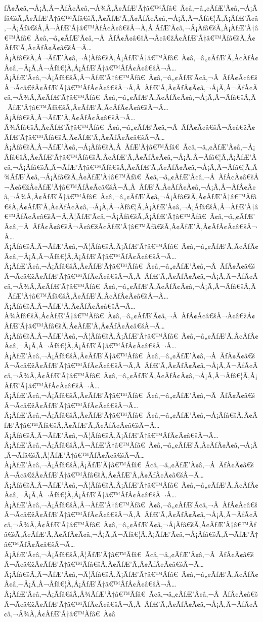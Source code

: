 \documentclass{article}
\begin{document}
\begin{outline}[enumerate]
ƒÂ¢Ã¢â‚¬Å¡Ã‚Â¬ÃƒÂ¢Ã¢â‚¬Å¾Ã‚Â¢ÃƒÆ’Ã†â€™Ãƒâ€ Ã¢â‚¬â„¢ÃƒÆ’Ã¢â‚¬Å¡Ãƒâ€šÃ‚Â¢ÃƒÆ’Ã†â€™Ãƒâ€šÃ‚Â¢ÃƒÆ’Ã‚Â¢ÃƒÂ¢Ã¢â‚¬Å¡Ã‚Â¬Ãƒâ€¦Ã‚Â¡ÃƒÆ’Ã¢â‚¬Å¡Ãƒâ€šÃ‚Â¬ÃƒÆ’Ã†â€™ÃƒÂ¢Ã¢â€šÂ¬Ã‚Â¦ÃƒÆ’Ã¢â‚¬Å¡Ãƒâ€šÃ‚Â¡ÃƒÆ’Ã†â€™Ãƒâ€ Ã¢â‚¬â„¢ÃƒÆ’Ã¢â‚¬Â ÃƒÂ¢Ã¢â€šÂ¬Ã¢â€žÂ¢ÃƒÆ’Ã†â€™Ãƒâ€šÃ‚Â¢ÃƒÆ’Ã‚Â¢ÃƒÂ¢Ã¢â€šÂ¬Ã…Â¡Ãƒâ€šÃ‚Â¬ÃƒÆ’Ã¢â‚¬Â¦Ãƒâ€šÃ‚Â¡ÃƒÆ’Ã†â€™Ãƒâ€ Ã¢â‚¬â„¢ÃƒÆ’Ã‚Â¢ÃƒÂ¢Ã¢â‚¬Å¡Ã‚Â¬Ãƒâ€¦Ã‚Â¡ÃƒÆ’Ã†â€™ÃƒÂ¢Ã¢â€šÂ¬Ã…Â¡ÃƒÆ’Ã¢â‚¬Å¡Ãƒâ€šÃ‚Â¬ÃƒÆ’Ã†â€™Ãƒâ€ Ã¢â‚¬â„¢ÃƒÆ’Ã¢â‚¬Â ÃƒÂ¢Ã¢â€šÂ¬Ã¢â€žÂ¢ÃƒÆ’Ã†â€™ÃƒÂ¢Ã¢â€šÂ¬Ã‚Â ÃƒÆ’Ã‚Â¢ÃƒÂ¢Ã¢â‚¬Å¡Ã‚Â¬ÃƒÂ¢Ã¢â‚¬Å¾Ã‚Â¢ÃƒÆ’Ã†â€™Ãƒâ€ Ã¢â‚¬â„¢ÃƒÆ’Ã‚Â¢ÃƒÂ¢Ã¢â‚¬Å¡Ã‚Â¬Ãƒâ€šÃ‚Â ÃƒÆ’Ã†â€™Ãƒâ€šÃ‚Â¢ÃƒÆ’Ã‚Â¢ÃƒÂ¢Ã¢â€šÂ¬Ã…Â¡Ãƒâ€šÃ‚Â¬ÃƒÆ’Ã‚Â¢ÃƒÂ¢Ã¢â€šÂ¬Ã…Â¾Ãƒâ€šÃ‚Â¢ÃƒÆ’Ã†â€™Ãƒâ€ Ã¢â‚¬â„¢ÃƒÆ’Ã¢â‚¬Â ÃƒÂ¢Ã¢â€šÂ¬Ã¢â€žÂ¢ÃƒÆ’Ã†â€™Ãƒâ€šÃ‚Â¢ÃƒÆ’Ã‚Â¢ÃƒÂ¢Ã¢â€šÂ¬Ã…Â¡Ãƒâ€šÃ‚Â¬ÃƒÆ’Ã¢â‚¬Å¡Ãƒâ€šÃ‚Â ÃƒÆ’Ã†â€™Ãƒâ€ Ã¢â‚¬â„¢ÃƒÆ’Ã¢â‚¬Å¡Ãƒâ€šÃ‚Â¢ÃƒÆ’Ã†â€™Ãƒâ€šÃ‚Â¢ÃƒÆ’Ã‚Â¢ÃƒÂ¢Ã¢â‚¬Å¡Ã‚Â¬Ãƒâ€¦Ã‚Â¡ÃƒÆ’Ã¢â‚¬Å¡Ãƒâ€šÃ‚Â¬ÃƒÆ’Ã†â€™Ãƒâ€šÃ‚Â¢ÃƒÆ’Ã‚Â¢ÃƒÂ¢Ã¢â‚¬Å¡Ã‚Â¬Ãƒâ€¦Ã‚Â¾ÃƒÆ’Ã¢â‚¬Å¡Ãƒâ€šÃ‚Â¢ÃƒÆ’Ã†â€™Ãƒâ€ Ã¢â‚¬â„¢ÃƒÆ’Ã¢â‚¬Â ÃƒÂ¢Ã¢â€šÂ¬Ã¢â€žÂ¢ÃƒÆ’Ã†â€™ÃƒÂ¢Ã¢â€šÂ¬Ã‚Â ÃƒÆ’Ã‚Â¢ÃƒÂ¢Ã¢â‚¬Å¡Ã‚Â¬ÃƒÂ¢Ã¢â‚¬Å¾Ã‚Â¢ÃƒÆ’Ã†â€™Ãƒâ€ Ã¢â‚¬â„¢ÃƒÆ’Ã¢â‚¬Å¡Ãƒâ€šÃ‚Â¢ÃƒÆ’Ã†â€™Ãƒâ€šÃ‚Â¢ÃƒÆ’Ã‚Â¢ÃƒÂ¢Ã¢â‚¬Å¡Ã‚Â¬Ãƒâ€¦Ã‚Â¡ÃƒÆ’Ã¢â‚¬Å¡Ãƒâ€šÃ‚Â¬ÃƒÆ’Ã†â€™ÃƒÂ¢Ã¢â€šÂ¬Ã‚Â¦ÃƒÆ’Ã¢â‚¬Å¡Ãƒâ€šÃ‚Â¡ÃƒÆ’Ã†â€™Ãƒâ€ Ã¢â‚¬â„¢ÃƒÆ’Ã¢â‚¬Â ÃƒÂ¢Ã¢â€šÂ¬Ã¢â€žÂ¢ÃƒÆ’Ã†â€™Ãƒâ€šÃ‚Â¢ÃƒÆ’Ã‚Â¢ÃƒÂ¢Ã¢â€šÂ¬Ã…Â¡Ãƒâ€šÃ‚Â¬ÃƒÆ’Ã¢â‚¬Â¦Ãƒâ€šÃ‚Â¡ÃƒÆ’Ã†â€™Ãƒâ€ Ã¢â‚¬â„¢ÃƒÆ’Ã‚Â¢ÃƒÂ¢Ã¢â‚¬Å¡Ã‚Â¬Ãƒâ€¦Ã‚Â¡ÃƒÆ’Ã†â€™ÃƒÂ¢Ã¢â€šÂ¬Ã…Â¡ÃƒÆ’Ã¢â‚¬Å¡Ãƒâ€šÃ‚Â¢ÃƒÆ’Ã†â€™Ãƒâ€ Ã¢â‚¬â„¢ÃƒÆ’Ã¢â‚¬Â ÃƒÂ¢Ã¢â€šÂ¬Ã¢â€žÂ¢ÃƒÆ’Ã†â€™ÃƒÂ¢Ã¢â€šÂ¬Ã‚Â ÃƒÆ’Ã‚Â¢ÃƒÂ¢Ã¢â‚¬Å¡Ã‚Â¬ÃƒÂ¢Ã¢â‚¬Å¾Ã‚Â¢ÃƒÆ’Ã†â€™Ãƒâ€ Ã¢â‚¬â„¢ÃƒÆ’Ã‚Â¢ÃƒÂ¢Ã¢â‚¬Å¡Ã‚Â¬Ãƒâ€šÃ‚Â ÃƒÆ’Ã†â€™Ãƒâ€šÃ‚Â¢ÃƒÆ’Ã‚Â¢ÃƒÂ¢Ã¢â€šÂ¬Ã…Â¡Ãƒâ€šÃ‚Â¬ÃƒÆ’Ã‚Â¢ÃƒÂ¢Ã¢â€šÂ¬Ã…Â¾Ãƒâ€šÃ‚Â¢ÃƒÆ’Ã†â€™Ãƒâ€ Ã¢â‚¬â„¢ÃƒÆ’Ã¢â‚¬Â ÃƒÂ¢Ã¢â€šÂ¬Ã¢â€žÂ¢ÃƒÆ’Ã†â€™Ãƒâ€šÃ‚Â¢ÃƒÆ’Ã‚Â¢ÃƒÂ¢Ã¢â€šÂ¬Ã…Â¡Ãƒâ€šÃ‚Â¬ÃƒÆ’Ã¢â‚¬Â¦Ãƒâ€šÃ‚Â¡ÃƒÆ’Ã†â€™Ãƒâ€ Ã¢â‚¬â„¢ÃƒÆ’Ã‚Â¢ÃƒÂ¢Ã¢â‚¬Å¡Ã‚Â¬Ãƒâ€¦Ã‚Â¡ÃƒÆ’Ã†â€™ÃƒÂ¢Ã¢â€šÂ¬Ã…Â¡ÃƒÆ’Ã¢â‚¬Å¡Ãƒâ€šÃ‚Â¢ÃƒÆ’Ã†â€™Ãƒâ€ Ã¢â‚¬â„¢ÃƒÆ’Ã¢â‚¬Â ÃƒÂ¢Ã¢â€šÂ¬Ã¢â€žÂ¢ÃƒÆ’Ã†â€™ÃƒÂ¢Ã¢â€šÂ¬Ã‚Â ÃƒÆ’Ã‚Â¢ÃƒÂ¢Ã¢â‚¬Å¡Ã‚Â¬ÃƒÂ¢Ã¢â‚¬Å¾Ã‚Â¢ÃƒÆ’Ã†â€™Ãƒâ€ Ã¢â‚¬â„¢ÃƒÆ’Ã‚Â¢ÃƒÂ¢Ã¢â‚¬Å¡Ã‚Â¬Ãƒâ€¦Ã‚Â¡ÃƒÆ’Ã†â€™ÃƒÂ¢Ã¢â€šÂ¬Ã…Â¡ÃƒÆ’Ã¢â‚¬Å¡Ãƒâ€šÃ‚Â¢ÃƒÆ’Ã†â€™Ãƒâ€ Ã¢â‚¬â„¢ÃƒÆ’Ã¢â‚¬Â ÃƒÂ¢Ã¢â€šÂ¬Ã¢â€žÂ¢ÃƒÆ’Ã†â€™ÃƒÂ¢Ã¢â€šÂ¬Ã…Â¡ÃƒÆ’Ã¢â‚¬Å¡Ãƒâ€šÃ‚Â¢ÃƒÆ’Ã†â€™Ãƒâ€ Ã¢â‚¬â„¢ÃƒÆ’Ã¢â‚¬Å¡Ãƒâ€šÃ‚Â¢ÃƒÆ’Ã†â€™Ãƒâ€šÃ‚Â¢ÃƒÆ’Ã‚Â¢ÃƒÂ¢Ã¢â€šÂ¬Ã…Â¡Ãƒâ€šÃ‚Â¬ÃƒÆ’Ã¢â‚¬Â¦Ãƒâ€šÃ‚Â¡ÃƒÆ’Ã†â€™ÃƒÂ¢Ã¢â€šÂ¬Ã…Â¡ÃƒÆ’Ã¢â‚¬Å¡Ãƒâ€šÃ‚Â¬ÃƒÆ’Ã†â€™Ãƒâ€ Ã¢â‚¬â„¢ÃƒÆ’Ã‚Â¢ÃƒÂ¢Ã¢â‚¬Å¡Ã‚Â¬Ãƒâ€šÃ‚Â¦ÃƒÆ’Ã†â€™ÃƒÂ¢Ã¢â€šÂ¬Ã…Â¡ÃƒÆ’Ã¢â‚¬Å¡Ãƒâ€šÃ‚Â¡ÃƒÆ’Ã†â€™Ãƒâ€ Ã¢â‚¬â„¢ÃƒÆ’Ã¢â‚¬Â ÃƒÂ¢Ã¢â€šÂ¬Ã¢â€žÂ¢ÃƒÆ’Ã†â€™Ãƒâ€šÃ‚Â¢ÃƒÆ’Ã‚Â¢ÃƒÂ¢Ã¢â€šÂ¬Ã…Â¡Ãƒâ€šÃ‚Â¬ÃƒÆ’Ã¢â‚¬Â¦Ãƒâ€šÃ‚Â¡ÃƒÆ’Ã†â€™Ãƒâ€ Ã¢â‚¬â„¢ÃƒÆ’Ã‚Â¢ÃƒÂ¢Ã¢â‚¬Å¡Ã‚Â¬Ãƒâ€¦Ã‚Â¡ÃƒÆ’Ã†â€™ÃƒÂ¢Ã¢â€šÂ¬Ã…Â¡ÃƒÆ’Ã¢â‚¬Å¡Ãƒâ€šÃ‚Â¬ÃƒÆ’Ã†â€™Ãƒâ€ Ã¢â‚¬â„¢ÃƒÆ’Ã¢â‚¬Â ÃƒÂ¢Ã¢â€šÂ¬Ã¢â€žÂ¢ÃƒÆ’Ã†â€™ÃƒÂ¢Ã¢â€šÂ¬Ã‚Â ÃƒÆ’Ã‚Â¢ÃƒÂ¢Ã¢â‚¬Å¡Ã‚Â¬ÃƒÂ¢Ã¢â‚¬Å¾Ã‚Â¢ÃƒÆ’Ã†â€™Ãƒâ€ Ã¢â‚¬â„¢ÃƒÆ’Ã¢â‚¬Å¡Ãƒâ€šÃ‚Â¢ÃƒÆ’Ã†â€™Ãƒâ€šÃ‚Â¢ÃƒÆ’Ã‚Â¢ÃƒÂ¢Ã¢â‚¬Å¡Ã‚Â¬Ãƒâ€¦Ã‚Â¡ÃƒÆ’Ã¢â‚¬Å¡Ãƒâ€šÃ‚Â¬ÃƒÆ’Ã†â€™ÃƒÂ¢Ã¢â€šÂ¬Ã…Â¡ÃƒÆ’Ã¢â‚¬Å¡Ãƒâ€šÃ‚Â¦ÃƒÆ’Ã†â€™Ãƒâ€ Ã¢â‚¬â„¢ÃƒÆ’Ã¢â‚¬Â ÃƒÂ¢Ã¢â€šÂ¬Ã¢â€žÂ¢ÃƒÆ’Ã†â€™Ãƒâ€šÃ‚Â¢ÃƒÆ’Ã‚Â¢ÃƒÂ¢Ã¢â€šÂ¬Ã…Â¡Ãƒâ€šÃ‚Â¬ÃƒÆ’Ã¢â‚¬Â¦Ãƒâ€šÃ‚Â¡ÃƒÆ’Ã†â€™Ãƒâ€ Ã¢â‚¬â„¢ÃƒÆ’Ã‚Â¢ÃƒÂ¢Ã¢â‚¬Å¡Ã‚Â¬Ãƒâ€¦Ã‚Â¡ÃƒÆ’Ã†â€™ÃƒÂ¢Ã¢â€šÂ¬Ã…Â¡ÃƒÆ’Ã¢â‚¬Å¡Ãƒâ€šÃ‚Â¾ÃƒÆ’Ã†â€™Ãƒâ€ Ã¢â‚¬â„¢ÃƒÆ’Ã¢â‚¬Â ÃƒÂ¢Ã¢â€šÂ¬Ã¢â€žÂ¢ÃƒÆ’Ã†â€™ÃƒÂ¢Ã¢â€šÂ¬Ã‚Â ÃƒÆ’Ã‚Â¢ÃƒÂ¢Ã¢â‚¬Å¡Ã‚Â¬ÃƒÂ¢Ã¢â‚¬Å¾Ã‚Â¢ÃƒÆ’Ã†â€™Ãƒâ€ Ã¢â
\end{outline}
\end{document}
